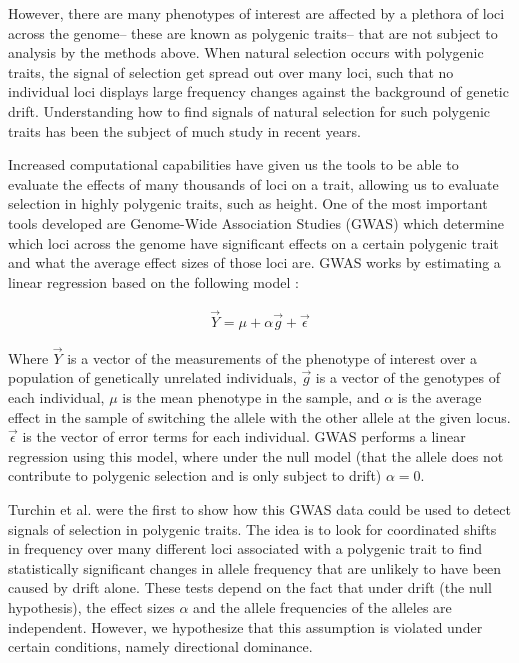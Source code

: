 \documentclass[a4paper,12pt]{article}
\begin{document}
However, there are many phenotypes of interest are affected by a
plethora of loci across the genome-- these are known as polygenic traits-- that are not subject to analysis by the methods
above. When natural selection occurs with polygenic
traits, the signal of selection get spread out over many loci, such
that no individual loci displays large frequency changes against the
background of genetic drift. Understanding
how to find signals of natural selection for such polygenic traits has been
the subject of much study in recent years.

Increased computational capabilities have given us the tools to be able to evaluate the effects
of many thousands of loci on a trait, allowing us to evaluate
selection in highly polygenic traits, such as height. One of the most
important tools developed are Genome-Wide Association Studies (GWAS)
which determine which loci across the genome have significant effects
on a certain polygenic trait \cite{gwasoverview} and what the average
effect sizes of those loci are. GWAS works by
estimating a linear regression based on the following model \cite{gwas}:

  \begin{align}
    \vec{Y} = \mu + \alpha \vec{g} + \vec{\epsilon}
  \end{align}

Where $\vec{Y}$ is a vector of the measurements of the phenotype of
interest over a population of genetically unrelated individuals,
$\vec{g}$ is a vector of the genotypes of each individual, $\mu$ is
the mean phenotype in the sample, and $\alpha$ is the average
effect in the sample of switching the allele with the
other allele at the given locus. $\vec{\epsilon}$ is the vector of
error terms for each individual. GWAS performs a linear regression
using this model, where under the null model (that the
allele does not contribute to polygenic selection and is only subject
to drift) $\alpha = 0$. 

Turchin et al. \cite{heightselection} were the first to show how this
GWAS data could be used to detect signals of selection in polygenic
traits. The idea is to look for coordinated shifts in frequency over
many different loci associated with a polygenic trait to find
statistically significant changes in allele frequency that are
unlikely to have been caused by drift alone. These tests depend on the
fact that under drift (the null hypothesis), the effect sizes $\alpha$
and the allele frequencies of the alleles are independent. However, we hypothesize that this assumption is violated
under certain conditions, namely directional dominance. 
\end{document}
